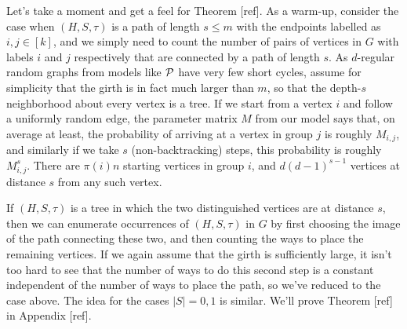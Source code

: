 Let's take a moment and get a feel for Theorem [ref]. As a warm-up, consider the case when $(H,S,\tau)$ is a path of length $s \le m$ with the endpoints labelled as $i,j\in [k]$, and we simply need to count the number of pairs of vertices in $G$ with labels $i$ and $j$ respectively that are connected by a path of length $s$. As $d$-regular random graphs from models like $\mathcal{P}$ have very few short cycles, assume for simplicity that the girth is in fact much larger than $m$, so that the depth-$s$ neighborhood about every vertex is a tree. If we start from a vertex $i$ and follow a uniformly random edge, the parameter matrix $M$ from our model says that, on average at least, the probability of arriving at a vertex in group $j$ is roughly $M_{i,j}$, and similarly if we take $s$ (non-backtracking) steps, this probability is roughly $M^s_{i,j}$. There are $\pi(i) n$ starting vertices in group $i$, and $d(d-1)^{s-1}$ vertices at distance $s$ from any such vertex. 

If $(H,S,\tau)$ is a tree in which the two distinguished vertices are at distance $s$, then we can enumerate occurrences of $(H,S,\tau)$ in $G$ by first choosing the image of the path connecting these two, and then counting the ways to place the remaining vertices. If we again assume that the girth is sufficiently large, it isn't too hard to see that the number of ways to do this second step is a constant independent of the number of ways to place the path, so we've reduced to the case above. The idea for the cases $|S| = 0,1$ is similar. We'll prove Theorem [ref] in Appendix [ref].




